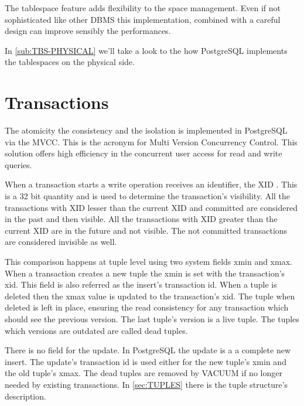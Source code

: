 The tablespace feature adds flexibility to the space management. Even if not sophisticated like
other DBMS this implementation, combined with a careful design can improve sensibly the
performances.\newline

In \ref{sub:TBS-PHYSICAL} we'll take a look to the how PostgreSQL implements the tablespaces on the
physical side.



\section{Transactions}
\label{sec:TRANSACTION}
The atomicity the consistency and the isolation is implemented in PostgreSQL via the
MVCC. This is the acronym for Multi Version Concurrency Control. This solution offers high efficiency in the concurrent user access for read
and write queries.\newline 

When a transaction starts a write operation receives an identifier, the XID . This is
a 32 bit quantity and is used to determine the transaction's visibility. All the transactions with
XID lesser than the current XID and committed are considered in the past and then visible. All the
transactions with XID greater than the current XID are in the future and not
visible. The not committed transactions are considered invisible as well.\newline

This comparison happens at tuple level using two system fields xmin and xmax. When a transaction
creates a new tuple the xmin is set with the transaction's xid. This field is also referred as the
insert's transaction id. When a tuple is deleted then the xmax value is updated to the transaction's
xid. The tuple when deleted is left in place, ensuring the read consistency for any transaction
which should see the previous version. The last tuple's version is a live tuple. The tuples which
versions are outdated are called dead tuples.\newline

There is no field for the update. In PostgreSQL the update is a a complete new insert. The update's
transaction id is used either for the new tuple's xmin and the old tuple's xmax. The dead tuples are
removed by VACUUM if no longer needed by existing transactions. In \ref{sec:TUPLES}
there is the tuple structure's description.\newline

